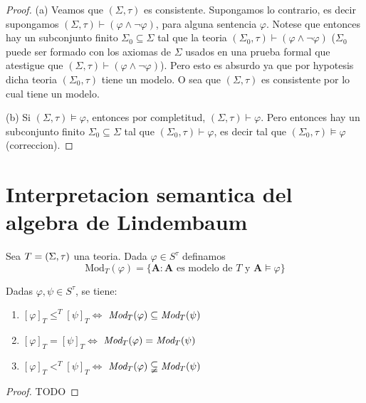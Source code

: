 \begin{proof}
  (a) Veamos que $(\Sigma ,\tau )$ es consistente. Supongamos lo contrario, es
decir supongamos $(\Sigma ,\tau )\vdash \left( \varphi \wedge \lnot \varphi
\right) $, para alguna sentencia $\varphi $. Notese que entonces hay un
subconjunto finito $\Sigma _{0}\subseteq \Sigma $ tal que la teoria $(\Sigma
_{0},\tau )\vdash \left( \varphi \wedge \lnot \varphi \right) $ ($\Sigma
_{0} $ puede ser formado con los axiomas de $\Sigma $ usados en una prueba
formal que atestigue que $(\Sigma ,\tau )\vdash \left( \varphi \wedge \lnot
\varphi \right) $). Pero esto es absurdo ya que por hypotesis dicha teoria $%
(\Sigma _{0},\tau )$ tiene un modelo. O sea que $(\Sigma ,\tau )$ es
consistente por lo cual tiene un modelo.

(b) Si $(\Sigma ,\tau )\models \varphi $, entonces por completitud, $(\Sigma
,\tau )\vdash \varphi $. Pero entonces hay un subconjunto finito $\Sigma
_{0}\subseteq \Sigma $ tal que $(\Sigma _{0},\tau )\vdash \varphi $, es
decir tal que $(\Sigma _{0},\tau )\models \varphi $ (correccion).
\end{proof}

\section{Interpretacion semantica del algebra de Lindembaum}
\begin{definition}
  Sea $T=(\Sigma,\tau)$ una teoria. Dada $\varphi\in S^\tau$ definamos
  $$
  \text{Mod}_T(\varphi)=\{\mathbf{A}:\mathbf{A} \text{ es modelo de } T \text{ y } \mathbf{A}\models\varphi\}
  $$
\end{definition}

\begin{lemma}
  Dadas $\varphi,\psi \in S^\tau$, se tiene:\begin{enumerate}
    \item $[\varphi]_T\leq^T[\psi]_T\iff$ $\emph{Mod}_T(\varphi)\subseteq\emph{Mod}_T(\psi)$
    \item $[\varphi]_T=[\psi]_T\iff$ $\emph{Mod}_T(\varphi)=\emph{Mod}_T(\psi)$
    \item $[\varphi]_T<^T[\psi]_T\iff$ $\emph{Mod}_T(\varphi)\subsetneqq\emph{Mod}_T(\psi)$
  \end{enumerate}
\end{lemma}
\begin{proof}
  TODO
\end{proof}

